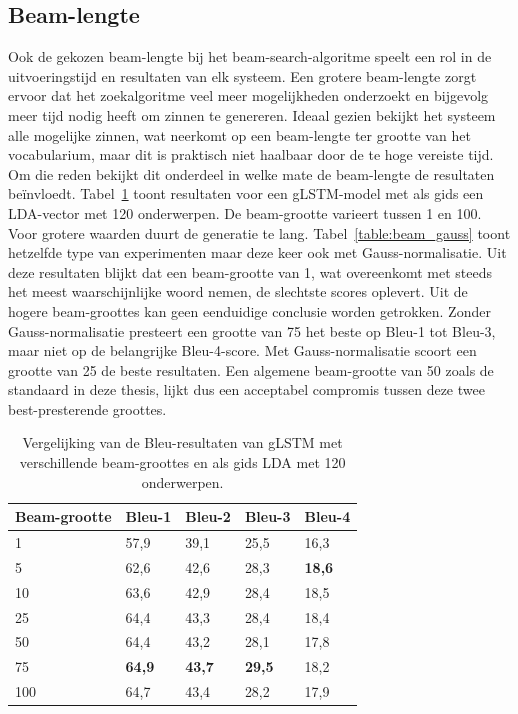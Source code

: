 \subsection{Beam-lengte}
Ook de gekozen beam-lengte bij het beam-search-algoritme speelt een rol in de uitvoeringstijd en resultaten van elk systeem. 
Een grotere beam-lengte zorgt ervoor dat het zoekalgoritme veel meer mogelijkheden onderzoekt en bijgevolg meer tijd nodig heeft om zinnen te genereren.
Ideaal gezien bekijkt het systeem alle mogelijke zinnen, wat neerkomt op een beam-lengte ter grootte van het vocabularium, maar dit is praktisch niet haalbaar door de te hoge vereiste tijd.
Om die reden bekijkt dit onderdeel in welke mate de beam-lengte de resultaten be\"invloedt.
Tabel~\ref{table:beam} toont resultaten voor een gLSTM-model met als gids een LDA-vector met 120 onderwerpen. De beam-grootte varieert tussen 1 en 100. Voor grotere waarden duurt de generatie te lang. Tabel~\ref{table:beam_gauss} toont hetzelfde type van experimenten maar deze keer ook met Gauss-normalisatie. Uit deze resultaten blijkt dat een beam-grootte van 1, wat overeenkomt met steeds het meest waarschijnlijke woord nemen, de slechtste scores oplevert. Uit de hogere beam-groottes kan geen eenduidige conclusie worden getrokken. Zonder Gauss-normalisatie presteert een grootte van 75 het beste op Bleu-1 tot Bleu-3, maar niet op de belangrijke Bleu-4-score. Met Gauss-normalisatie scoort een grootte van 25 de beste resultaten. Een algemene beam-grootte van 50 zoals de standaard in deze thesis, lijkt dus een acceptabel compromis tussen deze twee best-presterende groottes.

    \begin{table}
    	\centering
    	\begin{tabular}{lllll}
    		Beam-grootte                   & Bleu-1 & Bleu-2 & Bleu-3 & Bleu-4  \\ \hline
	    	1	      & 57,9   & 39,1   & 25,5   & 16,3        \\ 
    		5         & 62,6   & 42,6   & 28,3   & \textbf{18,6}     \\
    		10         & 63,6   & 42,9   & 28,4   & 18,5    \\
    		25        & 64,4   & 43,3   & 28,4   & 18,4     \\
    		50		  & 64,4   & 43,2   & 28,1   & 17,8    \\
    		75        & \textbf{64,9}   & \textbf{43,7}   & \textbf{29,5}   & 18,2    \\
    	    100		  & 64,7   & 43,4   & 28,2   & 17,9     \\\hline
    	\end{tabular}
    	\caption{Vergelijking van de Bleu-resultaten van gLSTM met verschillende beam-groottes en als gids LDA met 120 onderwerpen.}	
    	\label{table:beam}
    \end{table}

